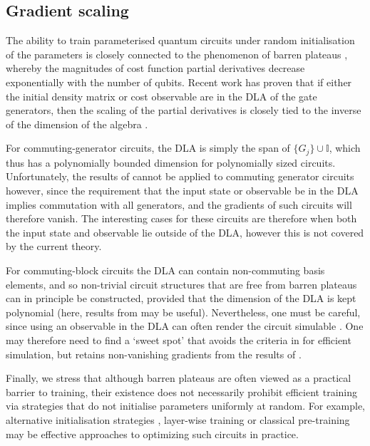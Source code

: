 \documentclass[a4paper,twocolumn,11pt]{quantumarticle}
\begin{document}
\subsection{Gradient scaling}
The ability to train parameterised quantum circuits under random initialisation of the parameters is closely connected to the phenomenon of barren plateaus \cite{mcclean2018barren}, whereby the magnitudes of cost function partial derivatives decrease exponentially with the number of qubits. Recent work has proven that if either the initial density matrix or cost observable are in the DLA of the gate generators, then the scaling of the partial derivatives is closely tied to the inverse of the dimension of the algebra \cite{ragoneunified, fontanaadjoint}. 

For commuting-generator circuits, the DLA is simply the span of $\{G_j\}\cup \mathbb{I}$, which thus has a polynomially bounded dimension for polynomially sized circuits. Unfortunately, the results of \cite{ragoneunified, fontanaadjoint} cannot be applied to commuting generator circuits however, since the requirement that the input state or observable be in the DLA implies commutation with all generators, and the gradients of such circuits will therefore vanish. The interesting cases for these circuits are therefore when both the input state and observable lie outside of the DLA, however this is not covered by the current theory. 

For commuting-block circuits the DLA can contain non-commuting basis elements, and so non-trivial circuit structures that are free from barren plateaus can in principle be constructed, provided that the dimension of the DLA is kept polynomial (here, results from \cite{wiersema2023classification} may be useful). Nevertheless, one must be careful, since using an observable in the DLA can often render the circuit simulable \cite{goh2023}. One may therefore need to find a `sweet spot' that avoids the criteria in \cite{goh2023} for efficient simulation, but retains non-vanishing gradients from the results of \cite{ragoneunified, fontanaadjoint}. 

Finally, we stress that although barren plateaus are often viewed as a practical barrier to training, their existence does not necessarily prohibit efficient training via strategies that do not initialise parameters uniformly at random. For example, alternative initialisation strategies \cite{grant2019, sack2022, zhang2022, volkoff2021}, layer-wise training \cite{skolik2021} or classical pre-training \cite{rudolph2023, simon2023} may be effective approaches to optimizing such circuits in practice. 
\end{document}
